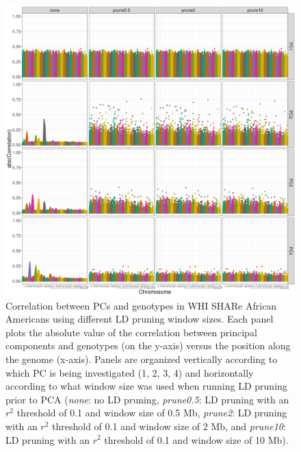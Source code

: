 \documentclass[12pt]{article}
\begin{document}
\begin{figure}[h]
\center
\includegraphics[width=\textwidth]{figs/pc_geno_corr/pc_geno_corr_compare_window}
\caption{Correlation between PCs and genotypes in WHI SHARe African Americans using different LD pruning window sizes. Each panel plots the absolute value of the correlation between principal components and genotypes (on the y-axis) versus the position along the genome (x-axis).  Panels are organized vertically according to which PC is being investigated (1, 2, 3, 4) and horizontally according to what window size was used when running LD pruning prior to PCA (\textit{none}: no LD pruning, \textit{prune0.5}: LD pruning with an $r^2$ threshold of 0.1 and window size of 0.5 Mb, \textit{prune2}: LD pruning with an $r^2$ threshold of 0.1 and window size of 2 Mb, and \textit{prune10}: LD pruning with an $r^2$ threshold of 0.1 and window size of 10 Mb).}
\label{fig:corr-compare-window}
\end{figure}
\end{document}
